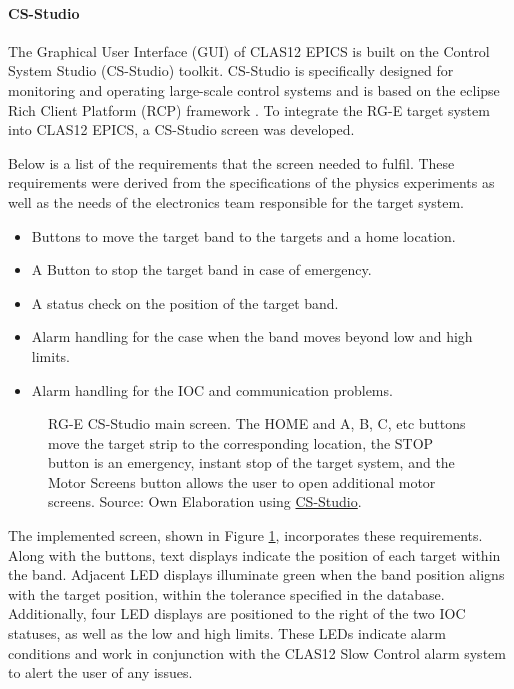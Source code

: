 \paragraph{CS-Studio}
    The Graphical User Interface (GUI) of CLAS12 EPICS is built on the Control System Studio (CS-Studio) toolkit.
    CS-Studio is specifically designed for monitoring and operating large-scale control systems and is based on the eclipse Rich Client Platform (RCP) framework \cite{kasemir2007}.
    To integrate the RG-E target system into CLAS12 EPICS, a CS-Studio screen was developed.

    Below is a list of the requirements that the screen needed to fulfil.
    These requirements were derived from the specifications of the physics experiments as well as the needs of the electronics team responsible for the target system.

    \begin{itemize}
        \item
            Buttons to move the target band to the targets and a home location.
        \item
            A Button to stop the target band in case of emergency.
        \item
            A status check on the position of the target band.
        \item
            Alarm handling for the case when the band moves beyond low and high limits.
        \item
            Alarm handling for the IOC and communication problems.
    \end{itemize}

    \begin{figure}[b!]
        \centering{}
        \caption[RG-E CS-Studio main screen]{RG-E CS-Studio main screen. The HOME and A, B, C, etc buttons move the target strip to the corresponding location, the STOP button is an emergency, instant stop of the target system, and the Motor Screens button allows the user to open additional motor screens.
        Source: Own Elaboration using \hyperlink{controlsystemstudio.org/}{CS-Studio}.}
        \label{fig::rge_motorx}
    \end{figure}

The implemented screen, shown in Figure \ref{fig::rge_motorx}, incorporates these requirements.
    Along with the buttons, text displays indicate the position of each target within the band.
    Adjacent LED displays illuminate green when the band position aligns with the target position, within the tolerance specified in the database.
    Additionally, four LED displays are positioned to the right of the two IOC statuses, as well as the low and high limits.
    These LEDs indicate alarm conditions and work in conjunction with the CLAS12 Slow Control alarm system to alert the user of any issues.

